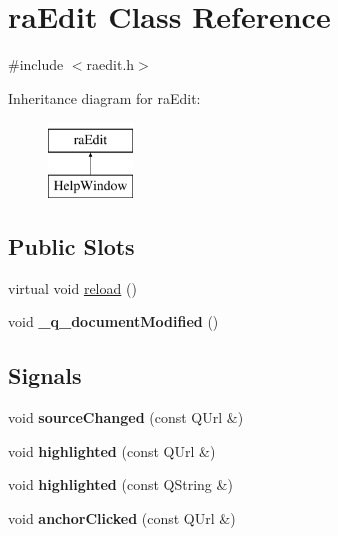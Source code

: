 \hypertarget{classraEdit}{
\section{raEdit Class Reference}
\label{classraEdit}
}


{\ttfamily \#include $<$raedit.h$>$}

Inheritance diagram for raEdit:\begin{figure}[H]
\begin{center}
\leavevmode
\includegraphics[height=2.000000cm]{classraEdit}
\end{center}
\end{figure}
\subsection*{Public Slots}
\begin{DoxyCompactItemize}
\item 
virtual void \hyperlink{classraEdit_a737a96c707421d6494a4c24e595bbc9b}{reload} ()
\item 
\hypertarget{classraEdit_a68ac9af9497a0787573c14d2033ac96a}{
void {\bfseries \_\-q\_\-documentModified} ()}
\label{classraEdit_a68ac9af9497a0787573c14d2033ac96a}

\end{DoxyCompactItemize}
\subsection*{Signals}
\begin{DoxyCompactItemize}
\item 
\hypertarget{classraEdit_ab53e3ca23b3465172c5e60737e8c0fd5}{
void {\bfseries sourceChanged} (const QUrl \&)}
\label{classraEdit_ab53e3ca23b3465172c5e60737e8c0fd5}

\item 
\hypertarget{classraEdit_a519ba856354b849e3fb62334a37e0474}{
void {\bfseries highlighted} (const QUrl \&)}
\label{classraEdit_a519ba856354b849e3fb62334a37e0474}

\item 
\hypertarget{classraEdit_aeee32446463b15d9004c3dcca504ace7}{
void {\bfseries highlighted} (const QString \&)}
\label{classraEdit_aeee32446463b15d9004c3dcca504ace7}

\item 
\hypertarget{classraEdit_ab577926d331c0f19f4b9c91c798107d1}{
void {\bfseries anchorClicked} (const QUrl \&)}
\label{classraEdit_ab577926d331c0f19f4b9c91c798107d1}

\end{DoxyCompactItemize}
